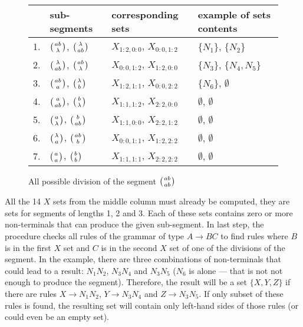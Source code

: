 \begin{figure}[H]
  \caption{All possible division of the segment $\wkpair{ab}{ab}$}
  \centering
  \label{tab:segment_divisions}
\begin{tabular}{ |l|l|l|l|  }
  \hline
   & sub-segments & corresponding sets  & example of sets contents \\
  \hline
  1. & $\wkpair{ab}{\lambda}$, $\wkpair{\lambda}{ab}$ & $X_{1:2,0:0}$, $X_{0:0,1:2}$ & $\{N_1\}$, $\{N_2\}$ \\ [1ex]
  2. & $\wkpair{\lambda}{ab}$, $\wkpair{ab}{\lambda}$ & $X_{0:0,1:2}$, $X_{1:2,0:0}$ & $\{N_3\}$, $\{N_4, N_5\}$ \\ [1ex]
  3. & $\wkpair{ab}{a}$, $\wkpair{\lambda}{b}$ & $X_{1:2,1:1}$, $X_{0:0,2:2}$ & $\{N_6\}$, $\emptyset$ \\ [1ex]
  4. & $\wkpair{a}{ab}$, $\wkpair{b}{\lambda}$ & $X_{1:1,1:2}$, $X_{2:2,0:0}$ & $\emptyset$, $\emptyset$ \\ [1ex]
  5. & $\wkpair{a}{\lambda}$, $\wkpair{b}{ab}$ & $X_{1:1,0:0}$, $X_{2:2,1:2}$ & $\emptyset$, $\emptyset$ \\ [1ex]
  6. & $\wkpair{\lambda}{a}$, $\wkpair{ab}{b}$ & $X_{0:0,1:1}$, $X_{1:2,2:2}$ & $\emptyset$, $\emptyset$ \\ [1ex]
  7. & $\wkpair{a}{a}$, $\wkpair{b}{b}$ & $X_{1:1,1:1}$, $X_{2:2,2:2}$ & $\emptyset$, $\emptyset$ \\ [1ex]
  \hline
\end{tabular}
\end{figure}


All the 14 $X$ sets from the middle column must already be computed, they are sets for segments of lengths 1, 2 and 3. Each of these sets contains zero or more non-terminals that can produce the given sub-segment. In last step, the procedure checks all rules of the grammar of type $A \rightarrow BC$ to find rules where $B$ is in the first $X$ set and $C$ is in the second $X$ set of one of the divisions of the segment. In the example, there are three combinations of non-terminals that could lead to a result: $N_1N_2$, $N_3N_4$ and $N_3N_5$ ($N_6$ is alone --- that is not not enough to produce the segment). Therefore, the result will be a set $\{X, Y, Z\}$ if there are rules $X \rightarrow N_1N_2$, $Y \rightarrow N_3N_4$ and $Z \rightarrow N_3N_5$. If only subset of these rules is found, the resulting set will contain only left-hand sides of those rules (or could even be an empty set).



